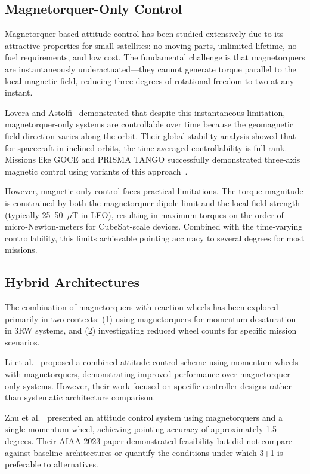 \documentclass[9pt]{extarticle}
\begin{document}
\subsection{Magnetorquer-Only Control}

Magnetorquer-based attitude control has been studied extensively due to its attractive properties for small satellites: no moving parts, unlimited lifetime, no fuel requirements, and low cost. The fundamental challenge is that magnetorquers are instantaneously underactuated---they cannot generate torque parallel to the local magnetic field, reducing three degrees of rotational freedom to two at any instant.

Lovera and Astolfi~\cite{lovera2004spacecraft} demonstrated that despite this instantaneous limitation, magnetorquer-only systems are controllable over time because the geomagnetic field direction varies along the orbit. Their global stability analysis showed that for spacecraft in inclined orbits, the time-averaged controllability is full-rank. Missions like GOCE and PRISMA TANGO successfully demonstrated three-axis magnetic control using variants of this approach~\cite{sechi2005magnetic, chasset2013axis}.

However, magnetic-only control faces practical limitations. The torque magnitude is constrained by both the magnetorquer dipole limit and the local field strength (typically 25--50~$\mu$T in LEO), resulting in maximum torques on the order of micro-Newton-meters for CubeSat-scale devices. Combined with the time-varying controllability, this limits achievable pointing accuracy to several degrees for most missions.

\subsection{Hybrid Architectures}

The combination of magnetorquers with reaction wheels has been explored primarily in two contexts: (1) using magnetorquers for momentum desaturation in 3RW systems, and (2) investigating reduced wheel counts for specific mission scenarios.

Li et al.~\cite{li2013design} proposed a combined attitude control scheme using momentum wheels with magnetorquers, demonstrating improved performance over magnetorquer-only systems. However, their work focused on specific controller designs rather than systematic architecture comparison.

Zhu et al.~\cite{zhu2023attitude} presented an attitude control system using magnetorquers and a single momentum wheel, achieving pointing accuracy of approximately 1.5 degrees. Their AIAA 2023 paper demonstrated feasibility but did not compare against baseline architectures or quantify the conditions under which 3+1 is preferable to alternatives.
\end{document}
